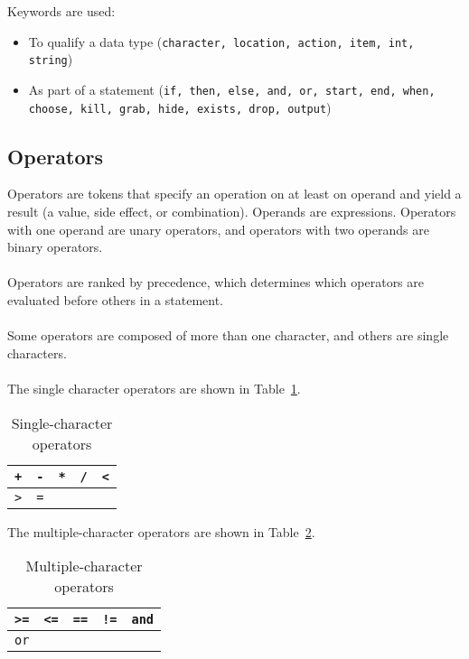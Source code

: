 \documentclass[12pt]{article}
\begin{document}
\noindent Keywords are used:
\begin{itemize}
\item To qualify a data type (\texttt{character, location, action, item, int, string})
\item As part of a statement (\texttt{if, then, else, and, or, start, end, when, choose, kill, grab, hide, exists, drop, output}) 
\end{itemize}


\subsection{Operators}
Operators are tokens that specify an operation on at least on operand and yield a result (a value, side effect, or combination).  Operands are expressions.  Operators with one operand are unary operators, and operators with two operands are binary operators.
\\
\\
\noindent Operators are ranked by precedence, which determines which operators are evaluated before others in a statement.
\\
\\
\noindent Some operators are composed of more than one character, and others are single characters.
\\
\\
\noindent The single character operators are shown in Table~\ref{single_operators}.

\begin{table}[htdp]
\caption{Single-character operators}
\begin{center}
\begin{tabular}{|c|c|c|c|c|}
\hline
\texttt{+} & \texttt{-} & \texttt{*} & \texttt{/} & \texttt{<} \\
\hline
\texttt{>} & \texttt{=} & \texttt{} & \texttt{} & \texttt{} \\
\hline
\end{tabular}
\end{center}
\label{single_operators}
\end{table}%


\noindent The multiple-character operators are shown in Table~\ref{multi_operators}.

\begin{table}[htdp]
\caption{Multiple-character operators}
\begin{center}
\begin{tabular}{|c|c|c|c|c|}
\hline
\texttt{>=} & \texttt{<=} & \texttt{==} & \texttt{!=} & \texttt{and} \\
\hline
\texttt{or} & \texttt{} & \texttt{} & \texttt{} & \texttt{} \\
\hline
\end{tabular}
\end{center}
\label{multi_operators}
\end{table}%
\end{document}
